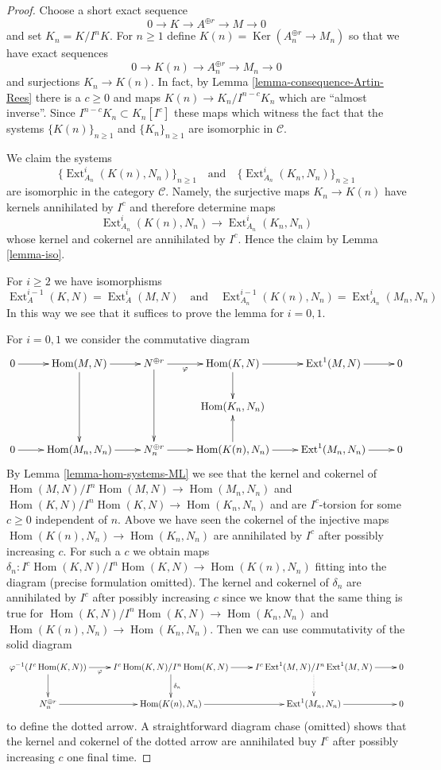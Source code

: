 \documentclass[10pt,a4paper]{amsart}
\theoremstyle{plain}
\theoremstyle{definition}
\theoremstyle{remark}
\numberwithin{equation}{subsection}
\def\Hom{\mathop{\mathrm{Hom}}\nolimits}
\def\Ext{\mathop{\mathrm{Ext}}\nolimits}
\def\Ker{\mathop{\mathrm{Ker}}}
\begin{document}
\begin{proof}
Choose a short exact sequence
$$
0 \to K \to A^{\oplus r} \to M \to 0
$$
and set $K_n = K/I^nK$.
For $n \geq 1$ define $K(n) = \Ker(A_n^{\oplus r} \to M_n)$
so that we have exact sequences
$$
0 \to K(n) \to A_n^{\oplus r} \to M_n \to 0
$$
and surjections $K_n \to K(n)$. In fact, by
Lemma \ref{lemma-consequence-Artin-Rees}
there is a $c \geq 0$ and maps $K(n) \to K_n/I^{n - c}K_n$
which are ``almost inverse''.
Since $I^{n - c}K_n \subset K_n[I^c]$ these maps which witness the fact that
the systems $\{K(n)\}_{n \geq 1}$ and $\{K_n\}_{n \geq 1}$
are isomorphic in $\mathcal{C}$.

\medskip\noindent
We claim the systems
$$
\{\Ext^i_{A_n}(K(n), N_n)\}_{n \geq 1}
\quad\text{and}\quad
\{\Ext^i_{A_n}(K_n, N_n)\}_{n \geq 1}
$$
are isomorphic in the category $\mathcal{C}$. Namely, the surjective maps
$K_n \to K(n)$ have kernels annihilated by $I^c$ and therefore determine maps
$$
\Ext^i_{A_n}(K(n), N_n) \to \Ext^i_{A_n}(K_n, N_n)
$$
whose kernel and cokernel are annihilated by $I^c$. Hence the claim
by Lemma \ref{lemma-iso}.

\medskip\noindent
For $i \geq 2$ we have isomorphisms
$$
\Ext^{i - 1}_A(K, N) = \Ext^i_A(M, N)
\quad\text{and}\quad
\Ext^{i - 1}_{A_n}(K(n), N_n) = \Ext^i_{A_n}(M_n, N_n)
$$
In this way we see that it suffices to prove the lemma
for $i = 0, 1$.

\medskip\noindent
For $i = 0, 1$ we consider the commutative diagram
$$
\xymatrix{
0 \ar[r] &
\Hom(M, N) \ar[r] \ar[dd] &
N^{\oplus r} \ar[r]_-\varphi \ar[dd] &
\Hom(K, N) \ar[r] \ar[d] &
\Ext^1(M, N) \ar[r] &
0 \\
& & &
\Hom(K_n, N_n)
\\
0 \ar[r] &
\Hom(M_n, N_n) \ar[r] &
N_n^{\oplus r} \ar[r] &
\Hom(K(n), N_n) \ar[r] \ar[u] &
\Ext^1(M_n, N_n) \ar[r] &
0
}
$$
By Lemma \ref{lemma-hom-systems-ML} we see that the kernel and cokernel of
$\Hom(M, N)/I^n \Hom(M, N) \to \Hom(M_n, N_n)$ and
$\Hom(K, N)/I^n \Hom(K, N) \to \Hom(K_n, N_n)$ and
are $I^c$-torsion for some $c \geq 0$ independent of $n$.
Above we have seen the cokernel of the injective maps
$\Hom(K(n), N_n) \to \Hom(K_n, N_n)$ are annihilated by $I^c$
after possibly increasing $c$. For such a $c$ we obtain maps
$\delta_n : I^c\Hom(K, N)/I^n\Hom(K, N) \to \Hom(K(n), N_n)$
fitting into the diagram (precise formulation omitted).
The kernel and cokernel of $\delta_n$ are annihilated by
$I^c$ after possibly increasing $c$ since we know that the
same thing is true for $\Hom(K, N)/I^n \Hom(K, N) \to \Hom(K_n, N_n)$
and $\Hom(K(n), N_n) \to \Hom(K_n, N_n)$.
Then we can use commutativity of the solid diagram
$$
\xymatrix{
\varphi^{-1}(I^c\Hom(K, N)) \ar[r]_-\varphi \ar[d] &
I^c\Hom(K, N)/I^n\Hom(K, N) \ar[r] \ar[d]^{\delta_n} &
I^c\Ext^1(M, N)/I^n\Ext^1(M, N) \ar[r] \ar@{..>}[d] & 0 \\
N_n^{\oplus r} \ar[r] &
\Hom(K(n), N_n) \ar[r] &
\Ext^1(M_n, N_n) \ar[r] & 0
}
$$
to define the dotted arrow. A straightforward diagram chase
(omitted) shows that the kernel and cokernel of the
dotted arrow are annihilated buy $I^c$ after possibly
increasing $c$ one final time.
\end{proof}
\end{document}
